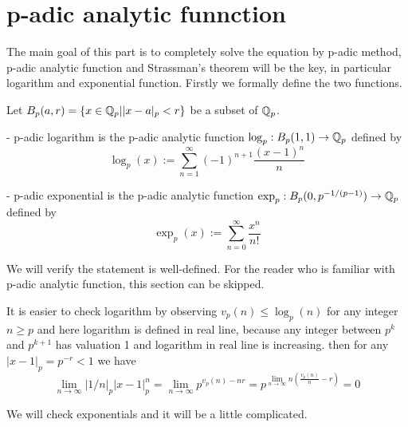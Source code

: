 \section{p-adic analytic funnction}

The main goal of this part is to completely solve the equation by p-adic method, p-adic analytic function and Strassman's theorem will be the key, in particular logarithm and exponential function. Firstly we formally define the two functions.

\begin{definition}
    Let \(B_p(a,r) = \{x \in \mathbb{Q}_p| |x-a|_p <r \}\) be a subset of \(\mathbb{Q}_p\).

    - p-adic logarithm is the p-adic analytic function \(\log_p: B_p(1,1) \to \mathbb{Q}_p\) defined by
    \[\log_p(x) := \sum_{n=1}^{\infty} (-1)^{n+1} \frac{(x-1)^n}{n}\]

    - p-adic exponential is the p-adic analytic function \(\exp_p : B_p(0,p^{-1/(p-1)}) \to \mathbb{Q}_p\) defined by
    \[\exp_p (x) :=  \sum_{n=0}^{\infty} \frac{x^n}{n!}\]
\end{definition}

We will verify the statement is well-defined. For the reader who is familiar with p-adic analytic function, this section can be skipped.

It is easier to check logarithm by observing \(v_p(n) \leq \log_p(n)\) for any integer \(n \geq p\) and here logarithm is defined in real line, because any integer between \(p^k\) and \(p^{k+1}\) has valuation 1 and logarithm in real line is increasing. then for any \(|x-1|_p = p^{-r} < 1\) we have
\[ \lim_{n \rightarrow \infty} |1/n|_p |x-1|_p^n =\lim_{n \rightarrow \infty} p^{v_p(n)-nr} = p^{\lim_{n \rightarrow \infty}n(\frac{v_p(n)}{n}-r)} = 0\]

We will check exponentials and it will be a little complicated.

